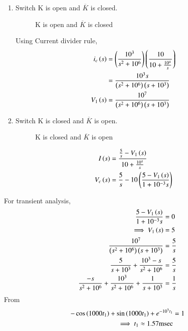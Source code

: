 \documentclass[journal,12pt,twocolumn]{IEEEtran}
\begin{document}
\solution
\begin{enumerate}
\item Switch K is open and $\overline{K}$ is closed.
\begin{figure}[ht]
  \centering
  \resizebox{0.50\columnwidth}{!}{}
  \caption{K is open and $\overline{K}$ is closed}
\end{figure}

Using Current divider rule,
\begin{align}
    i_c\left(s\right) &= \left(\frac{10^3}{s^2 + 10^6}\right)\left(\frac{10}{10 + \frac{10^4}{s}}\right)\\
    &= \frac{10^3 s}{\left(s^2 + 10^6\right)\left(s + 10^3\right)}\\
    V_1\left(s\right) &= \frac{10^7}{\left(s^2 + 10^6\right) \left(s + 10^3\right)} 
\end{align}


\item Switch K is closed and $\overline{K}$ is open.

\begin{figure}[ht]
  \centering
  \resizebox{0.55\columnwidth}{!}{}
  \caption{K is closed and $\overline{K}$ is open}
\end{figure}



\begin{align}
    I\left(s\right) &= \frac{\frac{5}{s} - V_1\left(s\right)}{10 + \frac{10^4}{s}}\\
    V_c\left(s\right) &= \frac{5}{s} - 10\left(\frac{5-V_1\left(s\right)}{1+10^{-3}s}\right)
\end{align}
\end{enumerate}

For transient analysis,
\begin{align}
    \frac{5-V_1\left(s\right)}{1+10^{-3}s} &= 0\\
    \implies V_1\left(s\right) &= 5\\
    \frac{10^7}{\left(s^2+10^6\right)\left(s+10^3\right)} &= \frac{5}{s}\\
    \frac{5}{s+10^3} + \frac{10^3-s}{s^2 + 10^6} &= \frac{5}{s}\\
    \frac{-s}{s^2+10^6} + \frac{10^3}{s^2 + 10^6} + \frac{1}{s+10^3} &= \frac{1}{s}
\end{align}
From 
\begin{align}
    -\cos\left(1000t_1\right)+\sin\left(1000t_1\right)+e^{-10^3 t_1} &= 1\\
    \implies t_1 \approx 1.57\text{msec}
\end{align}
\end{document}
